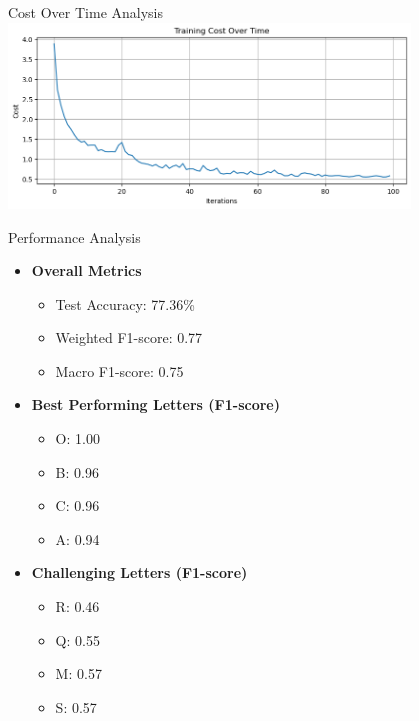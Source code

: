 \documentclass{beamer}
\begin{document}
\begin{frame}{Cost Over Time Analysis}
    \centering
    \includegraphics[width=0.8\textwidth]{cost_over_time.png}
\end{frame}

\begin{frame}{Performance Analysis}
    \begin{itemize}
        \item \textbf{Overall Metrics}
        \begin{itemize}
            \item Test Accuracy: 77.36\%
            \item Weighted F1-score: 0.77
            \item Macro F1-score: 0.75
        \end{itemize}
        \item \textbf{Best Performing Letters (F1-score)}
        \begin{itemize}
            \item O: 1.00
            \item B: 0.96
            \item C: 0.96
            \item A: 0.94
        \end{itemize}
        \item \textbf{Challenging Letters (F1-score)}
        \begin{itemize}
            \item R: 0.46
            \item Q: 0.55
            \item M: 0.57
            \item S: 0.57
        \end{itemize}
    \end{itemize}
\end{frame}
\end{document}
